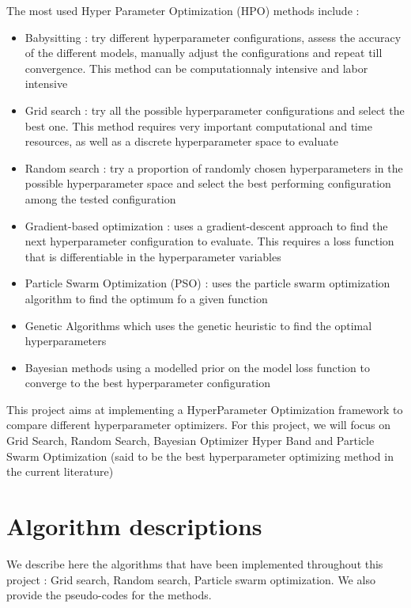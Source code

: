 \documentclass[a4 paper,11pt,2]{article}
\begin{document}
The most used Hyper Parameter Optimization (HPO) methods include \cite{yangHyperparameterOptimizationMachine2020} :
\begin{itemize}
    \item Babysitting : try different hyperparameter configurations, assess the accuracy
          of the different models, manually adjust the configurations and repeat till
          convergence. This method can be computationnaly intensive and labor intensive
    \item Grid search : try all the possible hyperparameter configurations and select the
          best one. This method requires very important computational and time resources,
          as well as a discrete hyperparameter space to evaluate
    \item Random search : try a proportion of randomly chosen hyperparameters in the
          possible hyperparameter space and select the best performing configuration
          among the tested configuration
    \item Gradient-based optimization : uses a gradient-descent approach to find the next
          hyperparameter configuration to evaluate. This requires a loss function that is
          differentiable in the hyperparameter variables
    \item Particle Swarm Optimization (PSO) : uses the particle swarm optimization
          algorithm to find the optimum fo a given function
    \item Genetic Algorithms which uses the genetic heuristic to find the optimal
          hyperparameters
    \item Bayesian methods using a modelled prior on the model loss function to converge
          to the best hyperparameter configuration
\end{itemize}

This project aims at implementing a HyperParameter Optimization framework to
compare different hyperparameter optimizers. For this project, we will focus on
Grid Search, Random Search, Bayesian Optimizer Hyper Band and Particle Swarm Optimization (said to be the best
hyperparameter optimizing method in the current literature)

\section{Algorithm descriptions}
We describe here the algorithms that have been implemented throughout this
project : Grid search, Random search, Particle swarm optimization. We also provide the pseudo-codes for the methods.
\end{document}
